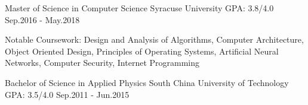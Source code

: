 

\begin{cvsimpleedus}

  \cvsimpledu
    {Master of Science in Computer Science}
    {Syracuse University}
    {GPA: 3.8/4.0}
    {Sep.2016 - May.2018}
    {
      \begin{cvitems}
        \item[] {Notable Coursework: Design and Analysis of Algorithms, Computer Architecture, Object Oriented Design, Principles of Operating Systems, Artificial Neural Networks, Computer Security, Internet Programming}
      \end{cvitems}
    }
    
    \cvsimpledu
    {Bachelor of Science in Applied Physics}
    {South China University of Technology}
    {GPA: 3.5/4.0}
    {Sep.2011 - Jun.2015}
    {
    }

\end{cvsimpleedus}
